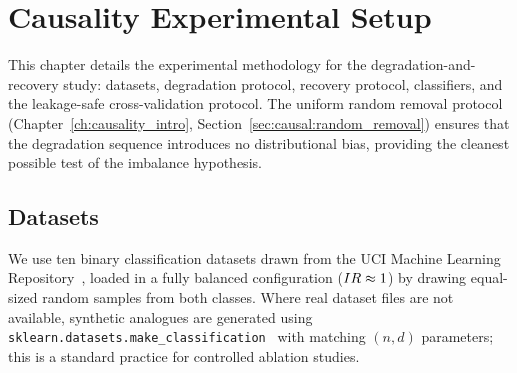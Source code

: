 
\chapter{Causality Experimental Setup}
\label{ch:causality_setup}

This chapter details the experimental methodology for the degradation-and-recovery study: datasets, degradation protocol, recovery protocol, classifiers, and the leakage-safe cross-validation protocol.
The uniform random removal protocol (Chapter~\ref{ch:causality_intro}, Section~\ref{sec:causal:random_removal}) ensures that the degradation sequence introduces no distributional bias, providing the cleanest possible test of the imbalance hypothesis.


\section{Datasets}
\label{sec:setup_causal:datasets}

We use ten binary classification datasets drawn from the UCI Machine Learning Repository~\cite{fernandez2018learning}, loaded in a fully balanced configuration ($IR \approx 1$) by drawing equal-sized random samples from both classes.
Where real dataset files are not available, synthetic analogues are generated using \texttt{sklearn.datasets.make\_classification}~\cite{blagus2013smote} with matching $(n, d)$ parameters; this is a standard practice for controlled ablation studies.


